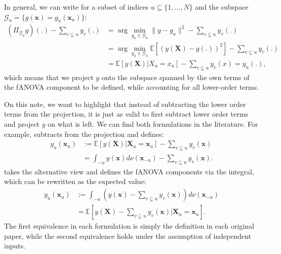 In general, we can write for a subset of indices $u \subseteq \{1, \dots, N\}$ and the subspace $\mathcal{G}_u = \{g(\boldsymbol{x}) = g_u(\boldsymbol{x}_u)\}$:
\begin{align*}
    (\Pi_{\mathcal{G}_u}y)(.) - \sum_{v \subsetneq u} y_v(.)
    &= \arg \min_{g_u \in \mathcal{G}_u} \|y - g_u\|^2 - \sum_{v \subsetneq u} y_v(.)\\
    &= \arg \min_{g_u \in \mathcal{G}_{u}} \mathbb{E}[(y(\boldsymbol{X}) - g(.))^2] - \sum_{v \subsetneq u} y_v(.)\\
    &= \mathbb{E}[y(\boldsymbol{X}) | X_{u} = x_u] - \sum_{v \subsetneq u} y_v(x) = y_u(.),
\end{align*}
which means that we project $y$ onto the subspace spanned by the own terms of the fANOVA component to be defined, while accounting for all lower-order terms.\par
On this note, we want to highlight that instead of subtracting the lower order terms from the projection, it is just as valid to first subtract lower order terms and project $y$ on what is left.
We can find both formulations in the literature.
For example, \cite{muehlenstaedt2012} subtracts from the projection and defines:
\begin{align*}
    y_u(\boldsymbol{x}_u) &:=
    \mathbb{E}[y(\boldsymbol{X}) | \boldsymbol{X}_{u} = \boldsymbol{x}_u] - \sum_{v \subsetneq u} y_v(\boldsymbol{x}) \\
    &= \int_{-u} y(\boldsymbol{x}) d \nu(\boldsymbol{x}_{-u}) - \sum_{v \subsetneq u} y_v(\boldsymbol{x}).
\end{align*}
\cite{hooker2004} takes the alternative view and defines the fANOVA components via the integral, which can be rewritten as the expected value:
\begin{align*}
    y_u(\boldsymbol{x}_u)
    &:= \int_{-u} (y(\boldsymbol{x}) - \sum_{v \subsetneq u} y_v(\boldsymbol{x})) d \nu(\boldsymbol{x}_{-u}) \\
    &= \mathbb{E}[y(\boldsymbol{X}) - \sum_{v \subsetneq u} y_v(\boldsymbol{x}) | \boldsymbol{X}_{u} = \boldsymbol{x}_u ].
\end{align*}
The first equivalence in each formulation is simply the definition in each original paper, while the second equivalence holds under the assumption of independent inputs.


